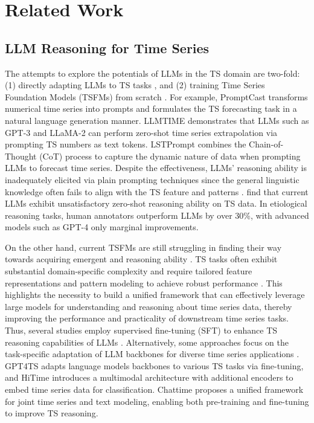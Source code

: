 \documentclass{article}
\theoremstyle{plain}
\theoremstyle{definition}
\theoremstyle{remark}
\begin{document}
\section{Related Work}
\label{abpx:related_work}
\subsection{LLM Reasoning for Time Series} 

The attempts to explore the potentials of LLMs in the TS domain are two-fold: (1) directly adapting LLMs to TS tasks \cite{tang2025time, naacl25picture, acl25promedts}, and (2) training Time Series Foundation Models (TSFMs) from scratch \cite{icml25moiraimoe, nips25tsrag, liu2025sundial, shi2025timemoe}. For example, PromptCast \cite{xue2023promptcast} transforms numerical time series into prompts and formulates the TS forecasting task in a natural language generation manner. LLMTIME \cite{gruver2023large} demonstrates that LLMs such as GPT-3 and LLaMA-2 can perform zero-shot time series extrapolation via prompting TS numbers as text tokens. LSTPrompt \cite{liu2024lstprompt} combines the Chain-of-Thought (CoT) process to capture the dynamic nature of data when prompting LLMs to forecast time series. Despite the effectiveness, LLMs' reasoning ability is inadequately elicited via plain prompting techniques since the general linguistic knowledge often fails to align with the TS feature and patterns \cite{acl25revisiting}. \citet{merrill2024language} find that current LLMs exhibit unsatisfactory zero-shot reasoning ability on TS data. In etiological reasoning tasks, human annotators outperform LLMs by over 30\%, with advanced models such as GPT-4 only marginal improvements. 

On the other hand, current TSFMs are still struggling in finding their way towards acquiring emergent and reasoning ability \cite{nips25trace}. TS tasks often exhibit substantial domain-specific complexity and require tailored feature representations and pattern modeling to achieve robust performance \cite{icml25timevlm, qiuvldb25Benchmarking, icml25cfpt}. This highlights the necessity to build a unified framework that can effectively leverage large models for understanding and reasoning about time series data, thereby improving the performance and practicality of downstream time series tasks. Thus, several studies employ supervised fine-tuning (SFT) to enhance TS reasoning capabilities of LLMs \cite{lee2025timecap, liu2024unitime, kong2025position}. Alternatively, some approaches focus on the task-specific adaptation of LLM backbones for diverse time series applications \cite{cheng2025instructime, lee2025timecap}. GPT4TS \cite{zhou2023onefitsall} adapts language models backbones to various TS tasks via fine-tuning, and HiTime \citet{tao2024hierarchical} introduces a multimodal architecture with additional encoders to embed time series data for classification. Chattime \cite{wang2025chattime} proposes a unified framework for joint time series and text modeling, enabling both pre-training and fine-tuning to improve TS reasoning.
\end{document}
